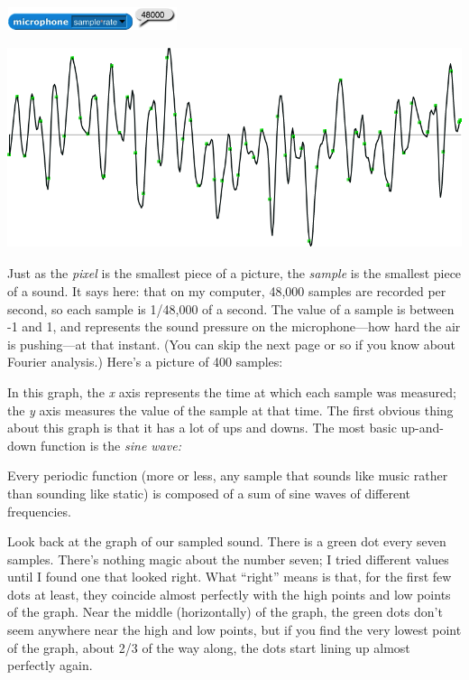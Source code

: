 \includegraphics[width=1.96528in,height=0.25694in]{media/image826.png}\includegraphics[width=5.99931in,height=2.62014in]{media/image827.png}Just
as the \emph{pixel} is the smallest piece of a picture, the
\emph{sample} is the smallest piece of a sound. It says here: that on my
computer, 48,000 samples are recorded per second, so each sample is
1/48,000 of a second. The value of a sample is between -1 and 1, and
represents the sound pressure on the microphone---how hard the air is
pushing---at that instant. (You can skip the next page or so if you know
about Fourier analysis.) Here's a picture of 400 samples:

In this graph, the \emph{x} axis represents the time at which each
sample was measured; the \emph{y} axis measures the value of the sample
at that time. The first obvious thing about this graph is that it has a
lot of ups and downs. The most basic up-and-down function is the
\emph{sine wave:}

Every periodic function (more or less, any sample that sounds like music
rather than sounding like static) is composed of a sum of sine waves of
different frequencies.

Look back at the graph of our sampled sound. There is a green dot every
seven samples. There's nothing magic about the number seven; I tried
different values until I found one that looked right. What ``right''
means is that, for the first few dots at least, they coincide almost
perfectly with the high points and low points of the graph. Near the
middle (horizontally) of the graph, the green dots don't seem anywhere
near the high and low points, but if you find the very lowest point of
the graph, about 2/3 of the way along, the dots start lining up almost
perfectly again.

